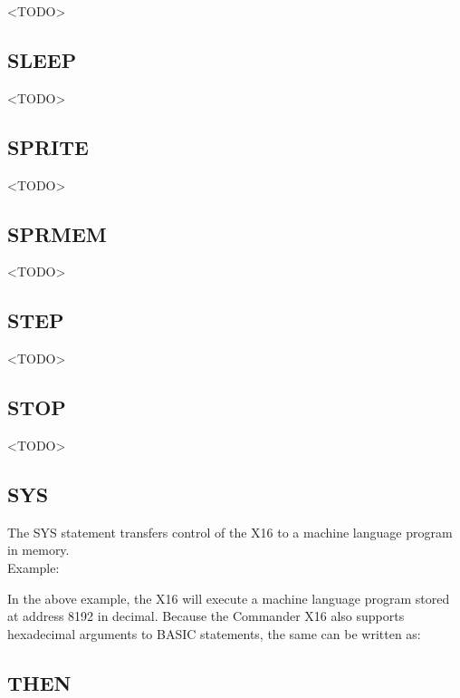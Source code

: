 <TODO>

\subsection{SLEEP}

<TODO>

\subsection{SPRITE}

<TODO>

\subsection{SPRMEM}

<TODO>

\subsection{STEP}

<TODO>

\subsection{STOP}

<TODO>

\subsection{SYS}

The {\ttfamily SYS} statement transfers control of the X16 to a machine
language program in memory.\\

Example:\\


In the above example, the X16 will execute a machine language program stored at
address 8192 in decimal.  Because the Commander X16 also supports hexadecimal
arguments to BASIC statements, the same can be written as:\\


\subsection{THEN}

